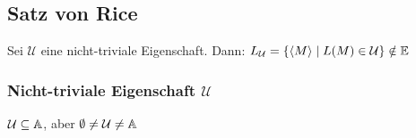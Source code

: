 \subsection*{Satz von Rice}
Sei $\mathcal{U}$ eine nicht-triviale Eigenschaft.
Dann: $L_{\mathcal{U}} = \{\langle M \rangle \mid L(M) \in \mathcal{U}\} \notin \mathbb{E}$

\subsubsection*{Nicht-triviale Eigenschaft $\mathcal{U}$}
$\mathcal{U} \subseteq \mathbb{A}$, aber $\emptyset \neq \mathcal{U} \neq \mathbb{A}$
